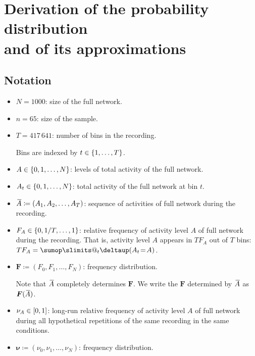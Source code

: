 \documentclass[\ifafour a4paper,12pt,\else a5paper,10pt,\fi%
onecolumn,oneside,article,%
british%
]{memoir}
\makeatletter
\theoremstyle{remark}
\theoremstyle{innote}
\def\sum{\DOTSI\sumop\slimits@}
\newcommand*{\delt}{\deltaup}%
\newcommand*{\defd}{\coloneqq}
\DeclarePairedDelimiter\clcl{[}{]}
\DeclarePairedDelimiter\set{\{}{\}}
\renewcommand*{\|}[1][]{\nonscript\,#1\vert\nonscript\;\mathopen{}}
\newcommand*{\widebar}[1]{{\mkern1.5mu\skew{2}\overline{\mkern-1.5mu#1\mkern-1.5mu}\mkern 1.5mu}}
\newcommand*{\yFF}{F}
\newcommand*{\yF}{\bm{\yFF}}
\newcommand*{\yAs}{\widebar{A}}%
\newcommand*{\ynuu}{\nu}
\newcommand*{\ynu}{\bm{\ynuu}}
\newcommand*{\yeq}{\mathrel{\!=\!}}
\makeatother
\begin{document}
\section{Derivation of the probability distribution\\ and of its approximations}
\label{sec:derivation}

\subsection{Notation}
\label{sec:notation}

\begin{itemize}[wide,label={}]
\item $N=1000$: size of the full network.

\item $n=65$: size of the sample.

\item $T=417\,641$: number of bins in the recording.

Bins are indexed by $t\in\set{1,\dotsc,T}$.

\item $A\in\set{0,1,\dotsc,N}$: levels of total activity of the full network.

\item $A_{t}\in\set{0,1,\dotsc,N}$: total activity of the full network at bin $t$.

\item $\yAs \defd (A_{1}, A_{2}, \dotsc, A_{T})$: sequence of activities of full
network during the recording.

\item $F_{A} \in \set{0,1/T,\dotsc,1}$: relative frequency of activity level $A$
of full network during the recording. That is, activity level $A$ appears
in $T F_{A}$ out of $T$ bins: $T F_{A} = \sum_{t}\delt(A_{t}\yeq A)$.

\item $\yF \defd (F_{0},F_{1}, \dotsc,F_{N})$: frequency distribution.

  Note that $\yAs$ completely determines $\yF$. We write the $\yF$
  determined by $\yAs$ as $\yF(\yAs)$.

\item $\nu_{A} \in \clcl{0,1}$: long-run relative frequency of activity level $A$
of full network during all hypothetical repetitions of the same recording
in the same conditions.

\item $\ynu \defd (\nu_{0}, \nu_{1}, \dotsc, \nu_{N})$: frequency distribution.


\end{itemize}
\end{document}
